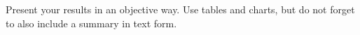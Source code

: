 Present your results in an objective way. Use tables and charts, but do not
forget to also include a summary in text form.